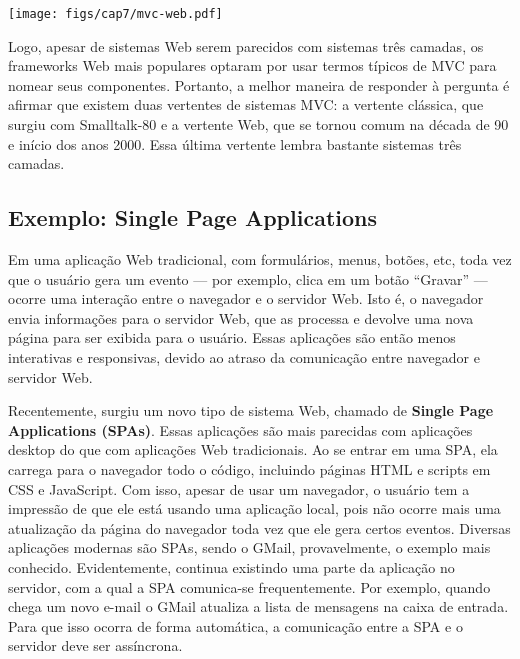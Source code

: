 \documentclass[
  11pt,
  twoside]{book}
\let\origfigure\figure
\let\endorigfigure\endfigure
\renewenvironment{figure}[1][2] {
    \expandafter\origfigure\expandafter[!h]
} {
    \endorigfigure
}
\begin{document}
\begin{figure}
\centering
\texttt{[image: figs/cap7/mvc-web.pdf]}
\caption{Arquitetura MVC Web}
\end{figure}

Logo, apesar de sistemas Web serem parecidos com sistemas três camadas,
os frameworks Web mais populares optaram por usar termos típicos de MVC
para nomear seus componentes. Portanto, a melhor maneira de responder à
pergunta é afirmar que existem duas vertentes de sistemas MVC: a
vertente clássica, que surgiu com Smalltalk-80 e a vertente Web, que se
tornou comum na década de 90 e início dos anos 2000. Essa última
vertente lembra bastante sistemas três camadas.

\hypertarget{exemplo-single-page-applications}{%
\subsection{Exemplo: Single Page
Applications}\label{exemplo-single-page-applications}}


Em uma aplicação Web tradicional, com formulários, menus, botões, etc,
toda vez que o usuário gera um evento --- por exemplo, clica em um botão
``Gravar'' --- ocorre uma interação entre o navegador e o servidor Web.
Isto é, o navegador envia informações para o servidor Web, que as
processa e devolve uma nova página para ser exibida para o usuário.
Essas aplicações são então menos interativas e responsivas, devido ao
atraso da comunicação entre navegador e servidor Web.

 Recentemente, surgiu um novo tipo de sistema Web, chamado
de \textbf{Single Page Applications (SPAs)}. Essas aplicações são mais
parecidas com aplicações desktop do que com aplicações Web tradicionais.
Ao se entrar em uma SPA, ela carrega para o navegador todo o código,
incluindo páginas HTML e scripts em CSS e JavaScript. Com isso, apesar
de usar um navegador, o usuário tem a impressão de que ele está usando
uma aplicação local, pois não ocorre mais uma atualização da página do
navegador toda vez que ele gera certos eventos. Diversas aplicações
modernas são SPAs, sendo o GMail, provavelmente, o exemplo mais
conhecido. Evidentemente, continua existindo uma parte da aplicação no
servidor, com a qual a SPA comunica-se frequentemente. Por exemplo,
quando chega um novo e-mail o GMail atualiza a lista de mensagens na
caixa de entrada. Para que isso ocorra de forma automática, a
comunicação entre a SPA e o servidor deve ser assíncrona.
\end{document}
